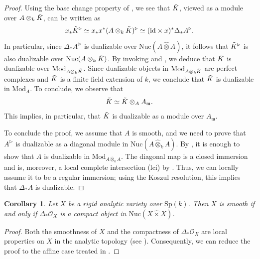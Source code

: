 \documentclass[oneside, hidelinks, 12pt, a4paper,reqno]{amsart}
\theoremstyle{plain}
\theoremstyle{definition}
\theoremstyle{plain}
\newtheorem{corollary}[corollary]{Corollary}
\newcommand{\Sp}{\mathrm{Sp}}
\newcommand{\Nuc}{\mathrm{Nuc}}
\newcommand{\Mod}{\mathrm{Mod}}
\begin{document}
\begin{proof}
    Using the base change property of , we see that $\Tilde{K}$, viewed as a module over $A\otimes_{k}\Tilde{K}$, can be written as
\[
x_{\ast}\Tilde{K}^\triangleright \simeq x_\ast x^\ast (A\otimes_{k}\Tilde{K})^\triangleright \simeq (\mathrm{id} \times x)^\ast \Delta_\ast A^{\triangleright}.
\]
In particular, since $\Delta_\ast A^\triangleright$ is dualizable over $\Nuc(A\widehat\otimes A)$, it follows that $\Tilde{K}^\triangleright$ is also dualizable over $\Nuc(A\otimes_{k}\Tilde{K})$. By invoking \cite[Theorem 5.50]{andreychev2021pseudocoherent} and \cite[Lemma 5.47]{andreychev2021pseudocoherent}, we deduce that $\Tilde{K}$ is dualizable over $\Mod_{A\otimes_{k}\Tilde{K}}$. Since dualizable objects in $\Mod_{A\otimes_{k}\Tilde{K}}$ are perfect complexes and $\Tilde{K}$ is a finite field extension of $k$, we conclude that $\Tilde{K}$ is dualizable in $\Mod_{A}$.
To conclude, we observe that 
\[
\Tilde{K} \simeq \Tilde{K} \otimes_{A}A_{\mathfrak{m}}.
\]
This implies, in particular, that $\Tilde{K}$ is dualizable as a module over $A_{\mathfrak{m}}$.

To conclude the proof, we assume that $A$ is smooth, and we need to prove that $A^\triangleright$ is dualizable as a diagonal module in $\Nuc(A\widehat\otimes_{k} A)$. By \cite[Corollary 5.51.1]{andreychev2021pseudocoherent}, it is enough to show that $A$ is dualizable in $\Mod_{A\widehat\otimes_{k}A}$. The diagonal map is a closed immersion and is, moreover, a local complete intersection (lci) by \cite[Corollary 5.11]{zavyalov2025foundationalresultsadicgeometry}. Thus, we can locally assume it to be a regular immersion; using the Koszul resolution, this implies that $\Delta_{\ast}A$ is dualizable.
\end{proof}

\begin{corollary}\label{cor: non commutative smoothness global case}
    Let $X$ be a rigid analytic variety over $\Sp(k)$. Then $X$ is smooth if and only if $\Delta_{\ast}\mathscr{O}_{X}$ is a compact object in $\Nuc(X\widehat\times X)$.
\end{corollary}

\begin{proof}
    Both the smoothness of $X$ and the compactness of $\Delta_{\ast}\mathscr{O}_{X}$ are local properties on $X$ in the analytic topology (see \cite[Theorem 5.41 and Theorem 5.42]{andreychev2021pseudocoherent}). Consequently, we can reduce the proof to the affine case treated in .
\end{proof}
\end{document}
